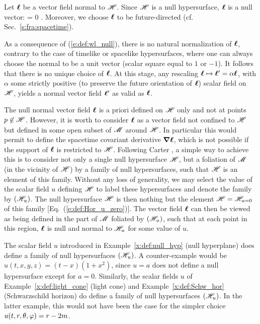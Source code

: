 Let $\bm{\ell}$ be a vector field normal to $\mathscr{H}$. Since $\mathscr{H}$ is a null hypersurface,
$\bm{\ell}$ is a null vector:
\be \label{e:def:wl_null}
    \wl\cdot\wl = 0 .
\ee
Moreover, we choose $\bm{\ell}$ to be future-directed (cf. Sec.~\ref{s:fra:spacetime}).

\begin{remark}
As a consequence of (\ref{e:def:wl_null}), there is no natural normalization
of $\bm{\ell}$, contrary to the case of timelike or spacelike hypersurfaces,
where one can always choose the normal to be a unit vector
(scalar square equal to $1$ or $-1$). It follows that there is no unique choice
of $\bm{\ell}$. At this stage, any rescaling $\bm{\ell} \mapsto \bm{\ell}' =  \alpha \bm{\ell}$, with
$\alpha$ some strictly positive (to preserve the future orientation of $\bm{\ell}$)
scalar field on $\mathscr{H}$,
yields a normal vector field $\bm{\ell}'$ as valid as $\bm{\ell}$.
\end{remark}
The null normal vector field $\bm{\ell}$ is a priori defined on $\mathscr{H}$
only and not at points $p\not\in\mathscr{H}$.
However, it is worth to consider $\bm{\ell}$ as a vector field
not confined to $\mathscr{H}$ but defined
in some open subset of $\mathscr{M}$ around $\mathscr{H}$.
In particular this would permit to define the spacetime covariant
derivative $\bm{\nabla}\bm{\ell}$, which is not possible if the
support of $\bm{\ell}$ is restricted to $\mathscr{H}$.
Following Carter \cite{Carte97}, a simple way to achieve
this is to consider not only a single null hypersurface $\mathscr{H}$,
but a foliation of $\mathscr{M}$ (in the vicinity
of $\mathscr{H}$) by a family of null hypersurfaces, such that $\mathscr{H}$ is an
element of this family.
Without any loss of generality,
we may select the value of the scalar field $u$ defining $\mathscr{H}$ to label these hypersurfaces and
denote the family by $(\mathscr{H}_u)$. The null hypersurface $\mathscr{H}$
is then nothing but the element $\mathscr{H} = \mathscr{H}_{u=0}$ of this family
[Eq.~(\ref{e:def:Hor_u_zero})].
The vector field $\bm{\ell}$ can then be viewed as being defined in the part of $\mathscr{M}$
foliated by $(\mathscr{H}_u)$, such that at each point in this region, $\bm{\ell}$
is null and normal to $\mathscr{H}_u$ for some value of $u$.

\begin{example}
The scalar field $u$ introduced in Example~\ref{x:def:null_hyp}
(null hyperplane) does define a family of null hypersurfaces
$(\mathscr{H}_u)$. A counter-example would be $u(t,x,y,z)=(t-x)(1+x^2)$, since
$u=a$ does not define a null hypersurface except for $a=0$.
Similarly, the scalar fields $u$ of
Example~\ref{x:def:light_cone} (light cone)
and Example~\ref{x:def:Schw_hor} (Schwarzschild horizon)
do define a family of null
hypersurfaces $(\mathscr{H}_u)$. In the latter example, this would not have been the
case for the simpler choice $u(t,r,\theta,\varphi)  = r - 2m$.
\end{example}

